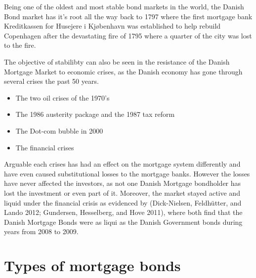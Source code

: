 \documentclass[12pt,twoside]{reedthesis}
\providecommand{\tightlist}{%
  \setlength{\itemsep}{0pt}\setlength{\parskip}{0pt}}
\begin{document}
Being one of the oldest and most stable bond markets in the world, the Danish Bond market has it's root all the way back to 1797 where the first mortgage bank Kreditkassen for Husejere i Kjøbenhavn was established to help rebuild Copenhagen after the devastating fire of 1795 where a quarter of the city was lost to the fire.

The objective of stabilibty can also be seen in the resistance of the Danish Mortgage Market to economic crises, as the Danish economy has gone through several crises the past 50 years.
\begin{itemize}
\tightlist
\item
  The two oil crises of the 1970's
\item
  The 1986 austerity package and the 1987 tax reform
\item
  The Dot-com bubble in 2000
\item
  The financial crises
\end{itemize}
Arguable each crises has had an effect on the mortgage system differently and have even caused substitutional losses to the mortgage banks. However the losses have never affected the investors, as not one Danish Mortgage bondholder has lost the investment or even part of it. Moreover, the market stayed active and liquid under the financial crisis as evidenced by (Dick-Nielsen, Feldhütter, and Lando 2012; Gundersen, Hesselberg, and Hove 2011), where both find that the Danish Mortgage Bonds were as liqui as the Danish Government bonds during years from 2008 to 2009.

\hypertarget{types-of-mortgage-bonds}{%
\section{Types of mortgage bonds}\label{types-of-mortgage-bonds}}
\end{document}

